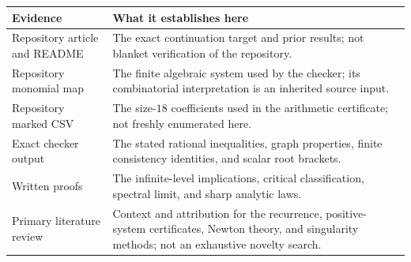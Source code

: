 \documentclass[11pt,a4paper]{article}
\theoremstyle{definition}
\theoremstyle{remark}
\begin{document}
\begin{center}\small
\begin{tabular}{@{}>{\raggedright\arraybackslash}p{.27\linewidth}p{.59\linewidth}@{}}
\toprule
Evidence & What it establishes here\\
\midrule
Repository article and README & The exact continuation target and prior
results; not blanket verification of the repository.\\[3pt]
Repository monomial map & The finite algebraic system used by the checker;
its combinatorial interpretation is an inherited source input.\\[3pt]
Repository marked CSV & The size-$18$ coefficients used in the arithmetic
certificate; not freshly enumerated here.\\[3pt]
Exact checker output & The stated rational inequalities, graph properties,
finite consistency identities, and scalar root brackets.\\[3pt]
Written proofs & The infinite-level implications, critical classification,
spectral limit, and sharp analytic laws.\\[3pt]
Primary literature review & Context and attribution for the recurrence,
positive-system certificates, Newton theory, and singularity methods;
not an exhaustive novelty search.\\
\bottomrule
\end{tabular}
\end{center}
\end{document}
